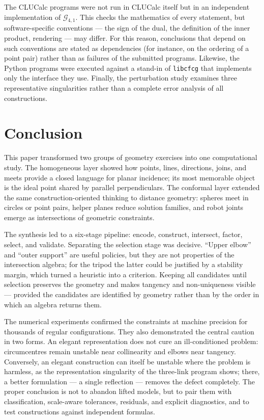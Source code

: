 \documentclass[11pt,a4paper]{article}
\theoremstyle{plain}
\theoremstyle{definition}
\theoremstyle{remark}
\newcommand{\GA}{\mathcal{G}_{4,1}}
\begin{document}
The CLUCalc programs were not run in CLUCalc itself but in an independent
implementation of $\GA$. This checks the mathematics of every statement, but
software-specific conventions --- the sign of the dual, the definition of the
inner product, rendering --- may differ. For this reason, conclusions that depend
on such conventions are stated as dependencies (for instance, on the ordering of
a point pair) rather than as failures of the submitted programs. Likewise, the
Python programs were executed against a stand-in of \texttt{libcfcg} that
implements only the interface they use. Finally, the perturbation study examines
three representative singularities rather than a complete error analysis of all
constructions.

\section{Conclusion}\label{sec:conclusion}

This paper transformed two groups of geometry exercises into one computational
study. The homogeneous layer showed how points, lines, directions, joins, and
meets provide a closed language for planar incidence; its most memorable object
is the ideal point shared by parallel perpendiculars. The conformal layer
extended the same construction-oriented thinking to distance geometry: spheres
meet in circles or point pairs, helper planes reduce solution families, and
robot joints emerge as intersections of geometric constraints.

The synthesis led to a six-stage pipeline: encode, construct, intersect, factor,
select, and validate. Separating the selection stage was decisive. ``Upper
elbow'' and ``outer support'' are useful policies, but they are not properties of
the intersection algebra; for the tripod the latter could be justified by a
stability margin, which turned a heuristic into a criterion. Keeping all
candidates until selection preserves the geometry and makes tangency and
non-uniqueness visible --- provided the candidates are identified by geometry
rather than by the order in which an algebra returns them.

The numerical experiments confirmed the constraints at machine precision for
thousands of regular configurations. They also demonstrated the central caution
in two forms. An elegant representation does not cure an ill-conditioned
problem: circumcentres remain unstable near collinearity and elbows near
tangency. Conversely, an elegant construction can itself be unstable where the
problem is harmless, as the representation singularity of the three-link
program shows; there, a better formulation --- a single reflection --- removes the
defect completely. The proper conclusion is not to abandon lifted models, but to
pair them with classification, scale-aware tolerances, residuals, and explicit
diagnostics, and to test constructions against independent formulas.
\end{document}
